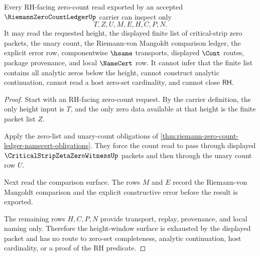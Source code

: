 \begin{theorem}
\label{thm:riemann-zero-count-ledger-window-exhaustion}
Every RH-facing zero-count read exported by an accepted $\RiemannZeroCountLedgerUp$ carrier can inspect only
$$
T,Z,U,M,E,H,C,P,N.
$$
It may read the requested height, the displayed finite list of critical-strip zero packets, the unary count, the Riemann-von Mangoldt comparison ledger, the explicit error row, componentwise $\hsame$ transports, displayed $\Cont$ routes, package provenance, and local $\NameCert$ row. It cannot infer that the finite list contains all analytic zeros below the height, cannot construct analytic continuation, cannot read a host zero-set cardinality, and cannot close $\mathsf{RH}$.
\end{theorem}
\begin{proof}
Start with an RH-facing zero-count request. By the carrier definition, the only height input is $T$, and the only zero data available at that height is the finite packet list $Z$.

Apply the zero-list and unary-count obligations of \autoref{thm:riemann-zero-count-ledger-namecert-obligations}. They force the count read to pass through displayed $\CriticalStripZetaZeroWitnessUp$ packets and then through the unary count row $U$.

Next read the comparison surface. The rows $M$ and $E$ record the Riemann-von Mangoldt comparison and the explicit constructive error before the result is exported.

The remaining rows $H,C,P,N$ provide transport, replay, provenance, and local naming only. Therefore the height-window surface is exhausted by the displayed packet and has no route to zero-set completeness, analytic continuation, host cardinality, or a proof of the RH predicate.
\end{proof}

